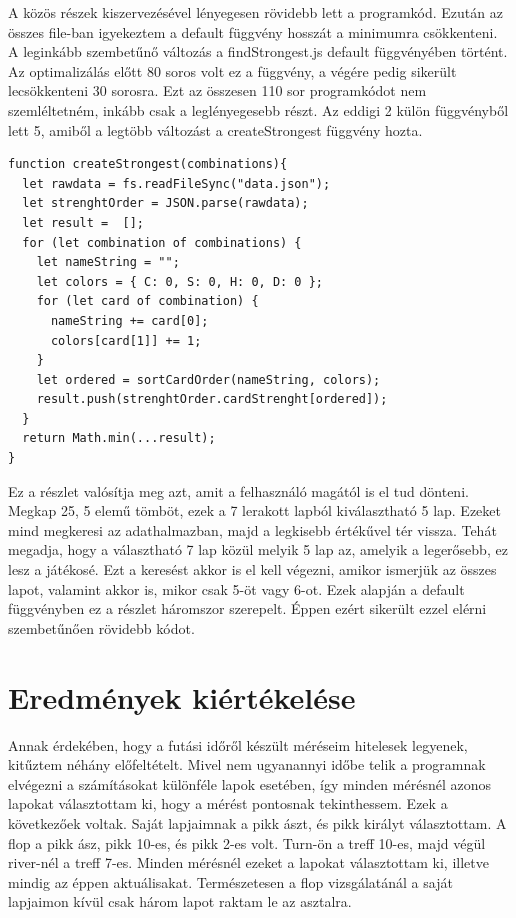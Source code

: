 A közös részek kiszervezésével lényegesen rövidebb lett a programkód. Ezután az összes file-ban igyekeztem a default függvény hosszát a minimumra csökkenteni. A leginkább szembetűnő változás a findStrongest.js default függvényében történt. Az optimalizálás előtt 80 soros volt ez a függvény, a végére pedig sikerült lecsökkenteni 30 sorosra. Ezt az összesen 110 sor programkódot nem szemléltetném, inkább csak a leglényegesebb részt. Az eddigi 2 külön függvényből lett 5, amiből a legtöbb változást a createStrongest függvény hozta.

\begin{lstlisting}[style=htmlcssjs]
function createStrongest(combinations){
  let rawdata = fs.readFileSync("data.json");
  let strenghtOrder = JSON.parse(rawdata);
  let result =  [];
  for (let combination of combinations) {
    let nameString = "";
    let colors = { C: 0, S: 0, H: 0, D: 0 };
    for (let card of combination) {
      nameString += card[0];
      colors[card[1]] += 1;
    }
    let ordered = sortCardOrder(nameString, colors);
    result.push(strenghtOrder.cardStrenght[ordered]);
  }
  return Math.min(...result);
}
\end{lstlisting}

Ez a részlet valósítja meg azt, amit a felhasználó magától is el tud dönteni. Megkap 25, 5 elemű tömböt, ezek a 7 lerakott lapból kiválasztható 5 lap. Ezeket mind megkeresi az adathalmazban, majd a legkisebb értékűvel tér vissza. Tehát megadja, hogy a választható 7 lap közül melyik 5 lap az, amelyik a legerősebb, ez lesz a játékosé. Ezt a keresést akkor is el kell végezni, amikor ismerjük az összes lapot, valamint akkor is, mikor csak 5-öt vagy 6-ot. Ezek alapján a default függvényben ez a részlet háromszor szerepelt. Éppen ezért sikerült ezzel elérni szembetűnően rövidebb kódot.

\section{Eredmények kiértékelése}
Annak érdekében, hogy a futási időről készült méréseim hitelesek legyenek, kitűztem néhány előfeltételt. Mivel nem ugyanannyi időbe telik a programnak elvégezni a számításokat különféle lapok esetében, így minden mérésnél azonos lapokat választottam ki, hogy a mérést pontosnak tekinthessem. Ezek a következőek voltak. Saját lapjaimnak a pikk ászt, és pikk királyt választottam. A flop a pikk ász, pikk 10-es, és pikk 2-es volt. Turn-ön a treff 10-es, majd végül river-nél a treff 7-es. Minden mérésnél ezeket a lapokat választottam ki, illetve mindig az éppen aktuálisakat. Természetesen a flop vizsgálatánál a saját lapjaimon kívül csak három lapot raktam le az asztalra.

